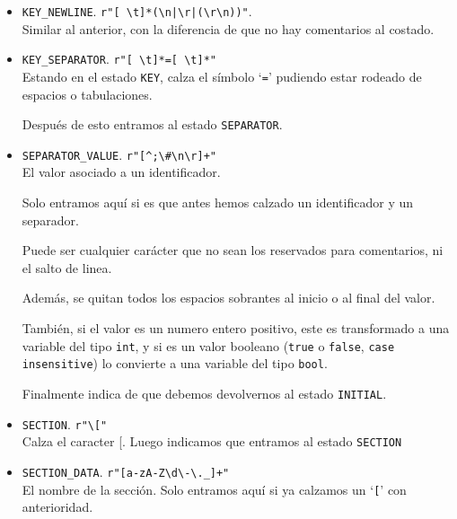 \documentclass[spanish, fleqn]{article}
\begin{document}
\begin{itemize}
    Si llegamos a este token, significa que el identificador fue \textit{seteado} sin un valor correspondiente, y tan solo se escribió un comentario al costado.
    
    \item \texttt{KEY\_NEWLINE}. \texttt{r"[ \textbackslash t]*(\textbackslash n|\textbackslash r|(\textbackslash r\textbackslash n))"}. \\ Similar al anterior, con la diferencia de que no hay comentarios al costado.
    
    \item \texttt{KEY\_SEPARATOR}. \texttt{r"[ \textbackslash t]*=[ \textbackslash t]*"} \\ Estando en el estado \texttt{KEY}, calza el símbolo `\texttt{=}' pudiendo estar rodeado de espacios o tabulaciones. 
    
    Después de esto entramos al estado \texttt{SEPARATOR}.
    
    \item \texttt{SEPARATOR\_VALUE}. \texttt{r"[\textasciicircum;\textbackslash \#\textbackslash n\textbackslash r]+"} \\ El valor asociado a un identificador. 
    
    Solo entramos aquí si es que antes hemos calzado un identificador y un separador.
    
    Puede ser cualquier carácter que no sean los reservados para comentarios, ni el salto de linea.
    
    Además, se quitan todos los espacios sobrantes al inicio o al final del valor. 
    
    También, si el valor es un numero entero positivo, este es transformado a una variable del tipo \texttt{int}, y si es un valor booleano (\texttt{true} o \texttt{false}, \texttt{case insensitive}) lo convierte a una variable del tipo \texttt{bool}. 
    
    Finalmente indica de que debemos devolvernos al estado \texttt{INITIAL}.
    
    \item \texttt{SECTION}. \texttt{r"\textbackslash["} \\ Calza el caracter [. Luego indicamos que entramos al estado \texttt{SECTION}
    
    \item \texttt{SECTION\_DATA}. \texttt{r"[a-zA-Z\textbackslash d\textbackslash-\textbackslash.\_]+"} \\ El nombre de la sección. Solo entramos aquí si ya calzamos un `\texttt{[}' con anterioridad.
    

\end{itemize}
\end{document}
